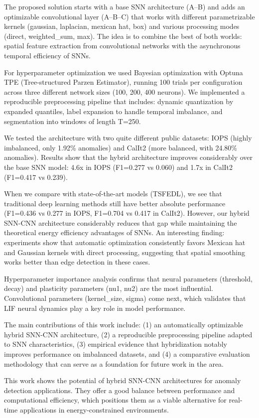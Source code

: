 The proposed solution starts with a base SNN architecture (A--B) and adds an optimizable convolutional layer (A--B--C) that works with different parametrizable kernels (gaussian, laplacian, mexican hat, box) and various processing modes (direct, weighted\_sum, max). The idea is to combine the best of both worlds: spatial feature extraction from convolutional networks with the asynchronous temporal efficiency of SNNs.

For hyperparameter optimization we used Bayesian optimization with Optuna TPE (Tree-structured Parzen Estimator), running 100 trials per configuration across three different network sizes (100, 200, 400 neurons). We implemented a reproducible preprocessing pipeline that includes: dynamic quantization by expanded quantiles, label expansion to handle temporal imbalance, and segmentation into windows of length T=250.

We tested the architecture with two quite different public datasets: IOPS (highly imbalanced, only 1.92\% anomalies) and CalIt2 (more balanced, with 24.80\% anomalies). Results show that the hybrid architecture improves considerably over the base SNN model: 4.6x in IOPS (F1=0.277 vs 0.060) and 1.7x in CalIt2 (F1=0.417 vs 0.239).

When we compare with state-of-the-art models (TSFEDL), we see that traditional deep learning methods still have better absolute performance (F1=0.436 vs 0.277 in IOPS, F1=0.704 vs 0.417 in CalIt2). However, our hybrid SNN-CNN architecture considerably reduces that gap while maintaining the theoretical energy efficiency advantages of SNNs. An interesting finding: experiments show that automatic optimization consistently favors Mexican hat and Gaussian kernels with direct processing, suggesting that spatial smoothing works better than edge detection in these cases.

Hyperparameter importance analysis confirms that neural parameters (threshold, decay) and plasticity parameters (nu1, nu2) are the most influential. Convolutional parameters (kernel\_size, sigma) come next, which validates that LIF neural dynamics play a key role in model performance.

The main contributions of this work include: (1) an automatically optimizable hybrid SNN-CNN architecture, (2) a reproducible preprocessing pipeline adapted to SNN characteristics, (3) empirical evidence that hybridization notably improves performance on imbalanced datasets, and (4) a comparative evaluation methodology that can serve as a foundation for future work in the area.

This work shows the potential of hybrid SNN-CNN architectures for anomaly detection applications. They offer a good balance between performance and computational efficiency, which positions them as a viable alternative for real-time applications in energy-constrained environments.